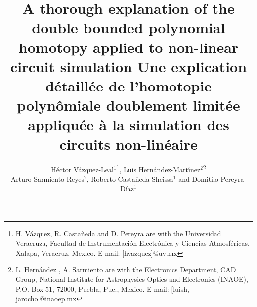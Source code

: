 \documentclass[journal,twocolumn]{IEEEtran}
\begin{document}
\title{A thorough explanation of the  double bounded polynomial homotopy applied to non-linear circuit simulation 
\newline\newline
Une explication d\'etaill\'ee de l'homotopie polyn\^omiale doublement limit\'ee appliqu\'ee \`a la simulation des circuits non-linéaire
}

\author{H\'ector V\'azquez-Leal$^1$\thanks{H.
V\'azquez, R. Casta\~neda and D. Pereyra  are with the Universidad Veracruza, Facultad de Instrumentaci\'on Electr\'onica y Ciencias Atmosf\'ericas, Xalapa, Veracruz, Mexico. E-mail:
[hvazquez]@uv.mx}, Luis Hern\'andez-Mart\'{\i}nez$^2$\thanks{L.
Hern\'andez , A. Sarmiento are with the Electronics Department, CAD Group,
National Institute for Astrophysics Optics and Electronics
(INAOE), P.O. Box 51, 72000, Puebla, Pue., Mexico. E-mail:
[luish, jarocho]@inaoep.mx} \\ Arturo Sarmiento-Reyes$^2$, Roberto Casta\~neda-Sheissa$^1$ and Domitilo Pereyra-D{\'i}az$^1$}


\maketitle
\end{document}
